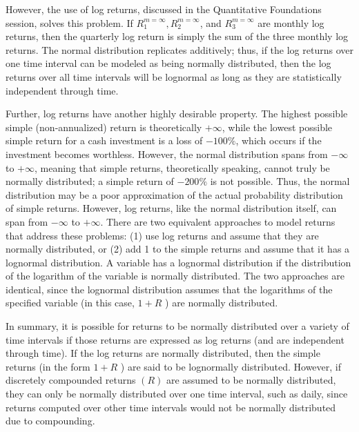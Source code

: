 \documentclass[11pt]{article}
\begin{document}
However, the use of log returns, discussed in the Quantitative Foundations session, solves this problem. If $R_{1}^{m=\infty}, R_{2}^{m=\infty}$, and $R_{3}^{m=\infty}$ are monthly log returns, then the quarterly log return is simply the sum of the three monthly log returns. The normal distribution replicates additively; thus, if the log returns over one time interval can be modeled as being normally distributed, then the log returns over all time intervals will be lognormal as long as they are statistically independent through time.

Further, log returns have another highly desirable property. The highest possible simple (non-annualized) return is theoretically $+\infty$, while the lowest possible simple return for a cash investment is a loss of $-100 \%$, which occurs if the investment becomes worthless. However, the normal distribution spans from $-\infty$ to $+\infty$, meaning that simple returns, theoretically speaking, cannot truly be normally distributed; a simple return of $-200 \%$ is not possible. Thus, the normal distribution may be a poor approximation of the actual probability distribution of simple returns. However, log returns, like the normal distribution itself, can span from $-\infty$ to $+\infty$. There are two equivalent approaches to model returns that address these problems: (1) use log returns and assume that they are normally distributed, or (2) add 1 to the simple returns and assume that it has a lognormal distribution. A variable has a lognormal distribution if the distribution of the logarithm of the variable is normally distributed. The two approaches are identical, since the lognormal distribution assumes that the logarithms of the specified variable (in this case, $1+R$ ) are normally distributed.

In summary, it is possible for returns to be normally distributed over a variety of time intervals if those returns are expressed as log returns (and are independent through time). If the log returns are normally distributed, then the simple returns (in the form $1+R$ ) are said to be lognormally distributed. However, if discretely compounded returns $(R)$ are assumed to be normally distributed, they can only be normally distributed over one time interval, such as daily, since returns computed over other time intervals would not be normally distributed due to compounding.
\end{document}
